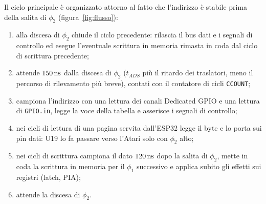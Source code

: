 \documentclass[11pt,a4paper,twoside,openright]{report}
\newcommand{\ns}{\,\mathrm{ns}}
\DeclareRobustCommand{\code}[1]{\begingroup\renewcommand{\_}{\textunderscore\allowbreak}\texttt{#1}\endgroup}
\begin{document}
Il ciclo principale è organizzato attorno al fatto che l'indirizzo è stabile prima della
salita di $\phi_2$ (figura~\ref{fig:flusso}):
\begin{enumerate}
  \item alla discesa di $\phi_2$ chiude il ciclo precedente: rilascia il bus dati e i
        segnali di controllo ed esegue l'eventuale scrittura in memoria rimasta in coda
        dal ciclo di scrittura precedente;
  \item attende $\SettleNs\ns$ dalla discesa di $\phi_2$ ($t_{ADS}$ più il ritardo dei
        traslatori, meno il percorso di rilevamento più breve), contati con il contatore
        di cicli \code{CCOUNT};
  \item campiona l'indirizzo con una lettura dei canali Dedicated GPIO e una lettura di
        \code{GPIO.in}, legge la voce della tabella e asserisce i segnali di controllo;
  \item nei cicli di lettura di una pagina servita dall'ESP32 legge il byte e lo porta
        sui pin dati: U19 lo fa passare verso l'Atari solo con $\phi_2$ alto;
  \item nei cicli di scrittura campiona il dato $\WrSampleNs\ns$ dopo la salita di
        $\phi_2$, mette in coda la scrittura in memoria per il $\phi_1$ successivo e applica
        subito gli effetti sui registri (latch, PIA);
  \item attende la discesa di $\phi_2$.
\end{enumerate}
\end{document}
